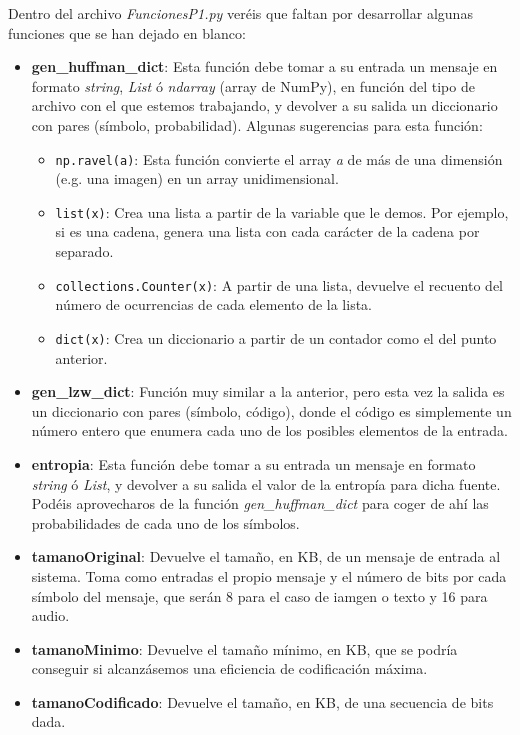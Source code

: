 \documentclass[es,practica]{uah}
\begin{document}
Dentro del archivo \emph{FuncionesP1.py} veréis que faltan por desarrollar algunas funciones que se han dejado en blanco:
\begin{itemize}
	\item {\bf gen\_huffman\_dict}: Esta función debe tomar a su entrada un mensaje en formato \emph{string}, \emph{List} ó \emph{ndarray} (array de NumPy), en función del tipo de archivo con el que estemos trabajando, y devolver a su salida un diccionario con pares (símbolo, probabilidad). Algunas sugerencias para esta función:
	\begin{itemize}
		\item \texttt{np.ravel(a)}: Esta función convierte el array \emph{a} de más de una dimensión (e.g. una imagen) en un array unidimensional.
		\item \texttt{list(x)}: Crea una lista a partir de la variable que le demos. Por ejemplo, si es una cadena, genera una lista con cada carácter de la cadena por separado.
		\item \texttt{collections.Counter(x)}: A partir de una lista, devuelve el recuento del número de ocurrencias de cada elemento de la lista. 
		\item \texttt{dict(x)}: Crea un diccionario a partir de un contador como el del punto anterior. 
	\end{itemize}

	\item {\bf gen\_lzw\_dict}: Función muy similar a la anterior, pero esta vez la salida es un diccionario con pares (símbolo, código), donde el código es simplemente un número entero que enumera cada uno de los posibles elementos de la entrada.

	\item {\bf entropia}: Esta función debe tomar a su entrada un mensaje en formato \emph{string} ó \emph{List}, y devolver a su salida el valor de la entropía para dicha fuente. Podéis aprovecharos de la función \emph{gen\_huffman\_dict} para coger de ahí las probabilidades de cada uno de los símbolos.
	\item {\bf tamanoOriginal}: Devuelve el tamaño, en KB, de un mensaje de entrada al sistema. Toma como entradas el propio mensaje y el número de bits por cada símbolo del mensaje, que serán 8 para el caso de iamgen o texto y 16 para audio. 
	\item {\bf tamanoMinimo}: Devuelve el tamaño mínimo, en KB, que se podría conseguir si alcanzásemos una eficiencia de codificación máxima.
	\item {\bf tamanoCodificado}: Devuelve el tamaño, en KB, de una secuencia de bits dada. 
\end{itemize}
\end{document}
